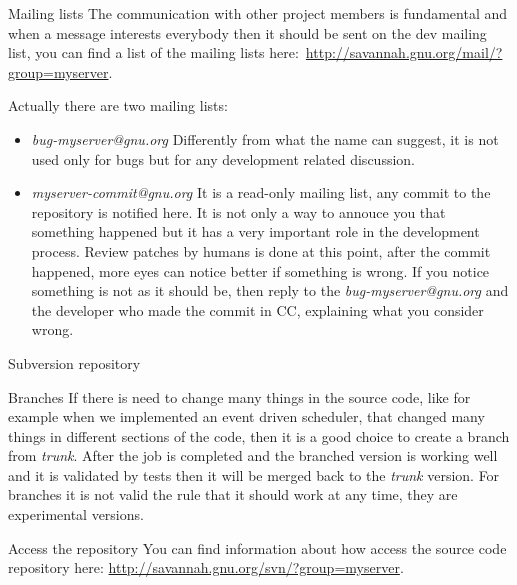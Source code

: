 \documentclass[12pt]{article}
\begin{document}
\begin{section}{Mailing lists}\label{section:ml}
The communication with other project members is fundamental and when a
message interests everybody then it should be sent on the dev mailing
list, you can find a list of the mailing lists
here:~\url{http://savannah.gnu.org/mail/?group=myserver}.

Actually there are two mailing lists:
\begin{itemize}
\item \textit{bug-myserver@gnu.org} Differently from what the name can
  suggest, it is not used only for bugs but for any development
  related discussion.
\item \textit{myserver-commit@gnu.org} It is a read-only mailing list,
  any commit to the repository is notified here.  It is not only a way
  to annouce you that something happened but it has a very important
  role in the development process.  Review patches by humans is done
  at this point, after the commit happened, more eyes can notice
  better if something is wrong.  If you notice something is not as it
  should be, then reply to the \textit{bug-myserver@gnu.org} and the
  developer who made the commit in CC, explaining what you consider
  wrong.
\end{itemize}
\end{section}

\begin{section}{Subversion repository}\label{section:svn}
\begin{subsection}{Branches}
If there is need to change many things in the source code, like for
example when we implemented an event driven scheduler, that changed
many things in different sections of the code, then it is a good
choice to create a branch from \textit{trunk}.
After the job is completed and the branched version is working well
and it is validated by tests then it will be merged back to the
\textit{trunk} version.
For branches it is not valid the rule that it should work at any time,
they are experimental versions.
\end{subsection}

\begin{subsection}{Access the repository}
You can find information about how access the source code repository here:
\url{http://savannah.gnu.org/svn/?group=myserver}.
\end{subsection}
\end{section}
\end{document}
